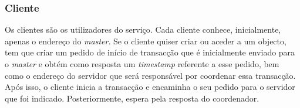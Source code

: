 \subsubsection{Cliente}

Os clientes são os utilizadores do serviço. Cada cliente conhece, inicialmente, apenas o endereço do \textit{master}. Se o cliente quiser criar ou aceder a um objecto, tem que criar um pedido de início de transacção que é inicialmente enviado para o \textit{master} e obtém como resposta um \textit{timestamp} referente a esse pedido, bem como o endereço do servidor que será responsável por coordenar essa transacção. Após isso, o cliente inicia a transacção e encaminha o seu pedido para o servidor que foi indicado. Posteriormente, espera pela resposta do coordenador. 